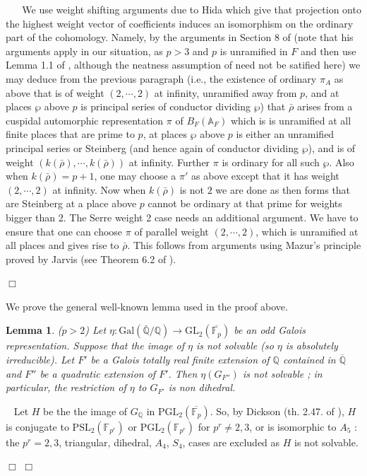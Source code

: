 \documentclass[12pt]{article}
\newcommand{\A}{\mathbb{A}}
\newcommand{\Q}{\mathbb{Q}}
\newcommand{\aQ}{\overline{\mathbb{Q}}}
\newcommand{\aFp}{\overline{\mathbb{F}_{p}}}
\newtheorem{lemma}[theorem]{Lemma}
\newenvironment{proof}{\smallskip\noindent{\bf Proof.}\
}{$\Box$\smallskip\goodbreak}
\def\rhob{ {\bar {\rho} } }
\newcommand{\Galois}{\mathrm{Gal}}
\newcommand{\Gal}{\Galois( \bar{ {\mathbb Q}}/{\mathbb Q})}
\begin{document}
\begin{proof}
\begin{proof}
We use weight shifting arguments due to Hida which
give that projection onto the highest weight vector of coefficients
induces an isomorphism on the ordinary part of the cohomology. Namely, by
the arguments in Section 8 of \cite{Hida1} (note that his arguments apply in our
situation,
as $p>3$ and $p$ is unramified in $F$ and then
use Lemma 1.1 of \cite{[T03]}, although the neatness assumption of
\cite{Hida}
need not be satified here)
we may deduce from the previous paragraph (i.e., the existence of
ordinary $\pi_A$ as above that is of weight $(2,\cdots,2)$ at
infinity, unramified away from $p$, and at places $\wp$ above $p$ is
principal series of conductor dividing $\wp$)
that $\rhob$ arises from a cuspidal automorphic representation $\pi$ of
$B_F(\A_F)$
which is
is unramified at all
finite places that are prime to $p$, at places $\wp$ above $p$ is
either an unramified
principal series or Steinberg (and hence again of conductor dividing $\wp$),
and is of weight $(k(\rhob),\cdots,k(\rhob))$ at infinity.
Further $\pi$ is ordinary
for all such $\wp$.  Also
when $k(\rhob)=p+1$, one may choose a $\pi'$ as above except that it
has weight $(2,\cdots,2)$ at infinity.
Now when $k(\rhob)$ is not $2$ we are done as
then forms that are Steinberg at a place above $p$ cannot be ordinary
at that prime for weights bigger than 2. The
Serre weight 2 case needs an additional argument.
We have to ensure that one can
choose $\pi$ of parallel weight $(2,\cdots,2)$, which is unramified
at all places and gives rise to $\rhob$. This follows from arguments
using Mazur's principle proved by Jarvis (see Theorem 6.2 of \cite{Jarvis}).



\end{proof}

We prove the general well-known lemma used in the proof above.


\begin{lemma}\label{potirr} ($p>2$)
Let $\eta : \Gal \rightarrow \mathrm{GL}_2 (\aFp )$ be an odd
Galois representation. Suppose that the image of $\eta$
is not solvable (so $\eta$ is absolutely irreducible). 
Let $F'$ be a Galois totally real
finite extension of $\Q$ contained in $\aQ$ and $F''$ be a quadratic
extension of $F'$. Then  $\eta (G_{F''})$
is not solvable ; in particular, the restriction 
of $\eta$ to $G_{F'}$ is non dihedral.
\end{lemma}
\begin{proof}
Let $H$ be the the image of $G_{\Q}$ in $\mathrm{PGL}_2 (\aFp )$.
So, by Dickson (th. 2.47. of \cite{[DDT]}), $H$ is conjugate to
$\mathrm{PSL}_2 (\mathbb{F}_{p^r})$ or
$\mathrm{PGL}_2 (\mathbb{F}_{p^r})$ for $p^r\not= 2,3$,
or is isomorphic to $A_5$ : 
the $p^r = 2,3$, triangular, dihedral, $A_4$, $S_4$,
cases are excluded as  $H$ is not solvable.


\end{proof}
\end{proof}
\end{document}
